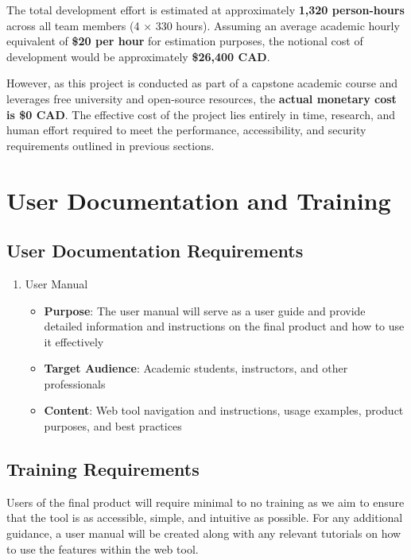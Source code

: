 \documentclass[12pt]{article}
\begin{document}
The total development effort is estimated at approximately \textbf{1,320 person-hours} across all team members (4 × 330 hours).  
Assuming an average academic hourly equivalent of \textbf{\$20 per hour} for estimation purposes, the notional cost of development would be approximately \textbf{\$26,400 CAD}.  

However, as this project is conducted as part of a capstone academic course and leverages free university and open-source resources, the \textbf{actual monetary cost is \$0 CAD}.  
The effective cost of the project lies entirely in time, research, and human effort required to meet the performance, accessibility, and security requirements outlined in previous sections.

\section{User Documentation and Training}
\subsection{User Documentation Requirements}
\begin{enumerate}
  \item User Manual
  \begin{itemize}
    \item \textbf{Purpose}: The user manual will serve as a user guide and provide detailed information and instructions on the final product and how to use it effectively
    \item \textbf{Target Audience}: Academic students, instructors, and other professionals
    \item \textbf{Content}: Web tool navigation and instructions, usage examples, product purposes, and best practices
  \end{itemize}
\end{enumerate}
\subsection{Training Requirements}
Users of the final product will require minimal to no training as we aim to ensure that the tool is as accessible, simple, and intuitive as possible. For any additional guidance,
a user manual will be created along with any relevant tutorials on how to use the features within the web tool. 
\end{document}
